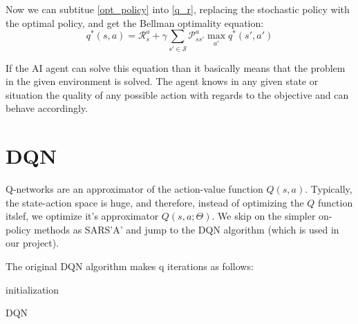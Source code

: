 \documentclass[10pt,a4paper,draft]{article}
\begin{document}
Now we can subtitue \eqref{opt_policy} into \eqref{q_r}, replacing the stochastic policy with the optimal policy, and get the Bellman optimality equation:
\begin{equation}
q^*(s,a) = \mathcal{R}_s^a + \gamma\sum_{s' \in \mathcal{S}} \mathcal{P}_{ss'}^a \max_{a'} q^*(s',a')
\label{bellman_opt_q_eq}
\end{equation}

If the AI agent can solve this equation than it basically means that the problem in the given environment is solved. The agent knows in any given state or situation the quality of any possible action with regards to the objective and can behave accordingly.

\section{DQN}
Q-networks are an approximator of the action-value function $Q(s,a)$. Typically, the state-action space is huge, and therefore, instead of optimizing the $Q$ function itslef, we optimize it's approximator $Q(s,a;\Theta)$. We skip on the simpler on-policy methods as SARS'A' and jump to the DQN algorithm (which is used in our project).

The original DQN algorithm \cite{dqn2013} makes q iterations as follows:

\begin{algorithm}[H]
\SetAlgoLined
\KwData{}
\KwResult{$\Theta$}
 initialization\;
 \caption{DQN}
\end{algorithm}




\end{document}
